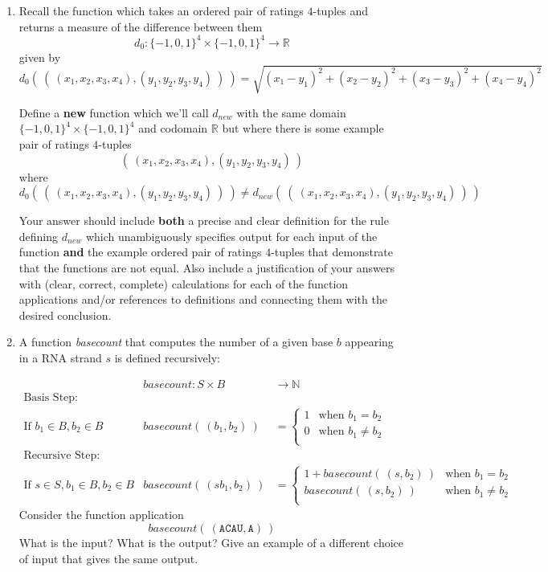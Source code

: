 \documentclass[12pt, oneside]{article}
\newcommand{\A}[0]{\texttt{A}}
\newcommand{\C}[0]{\texttt{C}}
\newcommand{\U}[0]{\texttt{U}}
\begin{document}
\begin{enumerate}[labelindent=0pt, leftmargin=0pt]
\begin{enumerate}
\item Recall the function which takes an ordered pair of ratings $4$-tuples and returns a measure of the difference between them
\[
    d_0: \{-1,0,1\}^4 \times \{-1,0,1\}^4 \to \mathbb{R}
\]
given by
\[
d_0 (~(~ (x_1, x_2, x_3, x_4), (y_1, y_2, y_3, y_4) ~) ~) = \sqrt{ (x_1 - y_1)^2 + (x_2 - y_2)^2 + (x_3 -y_3)^2 + (x_4 -y_4)^2}
\]

Define a {\bf new} function which we'll call $d_{new}$ with the same domain $\{-1,0,1\}^4 \times \{-1,0,1\}^4$
and codomain $\mathbb{R}$ but where there is some example pair of ratings $4$-tuples 
\[(~ (x_1, x_2, x_3, x_4), (y_1, y_2, y_3, y_4)~)\]
where
\[
d_0 (~(~ (x_1, x_2, x_3, x_4), (y_1, y_2, y_3, y_4) ~) ~) \neq d_{new} (~(~ (x_1, x_2, x_3, x_4), (y_1, y_2, y_3, y_4) ~) ~)
\]

    Your answer should include  {\bf both} a precise and clear definition for the rule defining
    $d_{new}$ which unambiguously specifies output for each input of the function {\bf and}
    the example ordered pair of ratings $4$-tuples that demonstrate that the functions are not equal.
    Also include a justification 
    of your answers with (clear, correct, complete) calculations for each of the function applications 
    and/or references to definitions and connecting them with
    the desired conclusion.

\item  A function \textit{basecount} that computes the number of a given base 
$b$ appearing in a RNA strand $s$ is defined recursively:
    
\[
\begin{array}{llll}
& \textit{basecount} : S \times B & \to \mathbb{N} &\\
\textrm{Basis Step:} &  \\
\textrm{If } b_1 \in B, b_2 \in B & \textit{basecount}(~(b_1, b_2)~) & = 
        \begin{cases}
            1 & \textrm{when } b_1 = b_2 \\
            0 & \textrm{when } b_1 \neq b_2 \\
        \end{cases}& \\
\textrm{Recursive Step:} & \\
\textrm{If } s \in S, b_1 \in B, b_2 \in B &\textit{basecount}(~(s b_1, b_2)~) & =
        \begin{cases}
            1 + \textit{basecount}(~(s, b_2)~) & \textrm{when } b_1 = b_2 \\
            \textit{basecount}(~(s, b_2)~) & \textrm{when } b_1 \neq b_2 \\
        \end{cases} &
\end{array}
\]
Consider the function application 
\[
  basecount( ~(\A\C\A\U, \A)~)
\]
What is the input?  What is the output? Give an example of a different choice of input that 
gives the same output.


\end{enumerate}
\end{enumerate}
\end{document}
